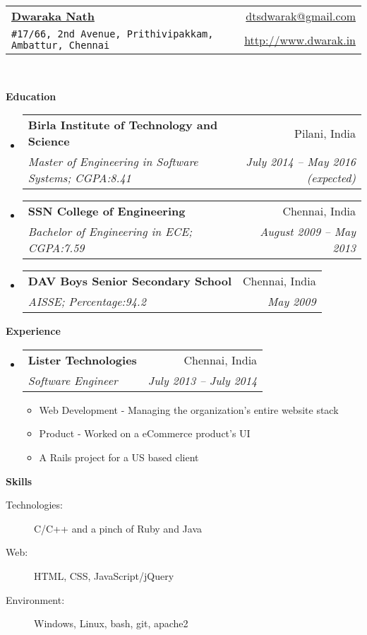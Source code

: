 \documentclass[letterpaper,11pt]{article}
\makeatletter
\newcommand{\resitem}[1]{\item #1 \vspace{-2pt}}
\newcommand{\resheading}[1]{{\large \colorbox{mygrey}{\begin{minipage}{\textwidth}{\textbf{#1 \vphantom{p\^{E}}}}\end{minipage}}}}
\newcommand{\ressubheading}[4]{
\begin{tabular*}{6.5in}{l@{\extracolsep{\fill}}r}
		\textbf{#1} & #2 \\
		\textit{#3} & \textit{#4} \\
\end{tabular*}\vspace{-6pt}}
\makeatother
\begin{document}
\newcommand{\mywebheader}{
\begin{tabular*}{7in}{l@{\extracolsep{\fill}}r}
	\textbf{\href{http://www.dwarak.in/}{\LARGE Dwaraka Nath}} & \href{mailto:dtsdwarak@gmail.com}{dtsdwarak@gmail.com}\\
	{\footnotesize \texttt{\#17/66, 2nd Avenue, Prithivipakkam, Ambattur, Chennai}} & \href{http://www.dwarak.in}{http://www.dwarak.in} \\
	\end{tabular*}
\\
\vspace{0.1in}}

\mywebheader

\resheading{Education}
	\begin{itemize}
		\item
			\ressubheading{{Birla Institute of Technology and Science}}{Pilani, India}{{Master of Engineering in Software Systems};{ CGPA:8.41}}{July 2014 -- May 2016 (expected)}
		\item
			\ressubheading{{SSN College of Engineering}}{Chennai, India}{{Bachelor of Engineering in ECE};{ CGPA:7.59}}{August 2009 -- May 2013}
		\item
			\ressubheading{{DAV Boys Senior Secondary School}}{Chennai, India}{{AISSE};{ Percentage:94.2}}{May 2009}			
	\end{itemize} %


\resheading{Experience}
	\begin{itemize}
		\item 
			\ressubheading{{Lister Technologies}}{Chennai, India}
				{Software Engineer}{July 2013 -- July 2014}
				{ \footnotesize
				\begin{itemize}
					\resitem{Web Development - Managing the organization's entire website stack}
					\resitem{Product - Worked on a eCommerce product's UI}
					\resitem{A Rails project for a US based client}
				\end{itemize}
				}

	\end{itemize}  %

\resheading{{Skills}}
	\begin{description}
		\item[Technologies:] { \footnotesize C/C++ and a pinch of Ruby and Java
		}
		\item[Web:] { \footnotesize HTML, CSS, JavaScript/jQuery
		}
		\item[Environment:] { \footnotesize
			Windows, Linux, bash, git, apache2
		}

	\end{description} %
\end{document}
